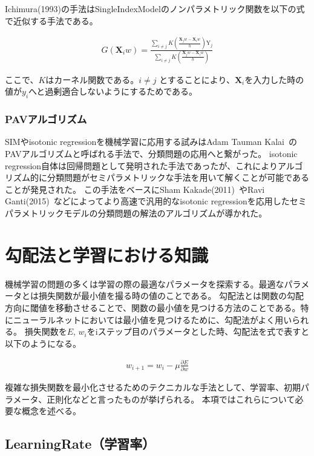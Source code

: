 Ichimura(1993)の手法はSingleIndexModelのノンパラメトリック関数を以下の式で近似する手法である。


\begin{eqnarray}
G(\mathbf{X}_iw)=\frac{\sum_{i\neq j} K\left(\frac{\mathbf{X}_j w - \mathbf{X}_i w}{h}\right)\mathrm{Y}_j}{\sum_{i\neq j} K\left(\frac{\mathbf{X}_j w - \mathbf{X}_i w}{h}\right)}
\label{eq:ichimura}
\end{eqnarray}

ここで、$ K $はカーネル関数である。$ i \neq j $ とすることにより、$ \mathbf{X}_i $を入力した時の値が$ y_i $へと過剰適合しないようにするためである。



\subsubsection{PAVアルゴリズム}

SIMやisotonic regressionを機械学習に応用する試みはAdam Tauman Kalai~\cite{isotron}のPAVアルゴリズムと呼ばれる手法で、分類問題の応用へと繋がった。
isotonic regression自体は回帰問題として発明された手法であったが、これによりアルゴリズム的に分類問題がセミパラメトリックな手法を用いて解くことが可能であることが発見された。
この手法をベースにSham Kakade(2011)~\cite{efficient_sim}やRavi Ganti(2015)~\cite{lsim}などによってより高速で汎用的なisotonic regressionを応用したセミパラメトリックモデルの分類問題の解法のアルゴリズムが導かれた。


\section{勾配法と学習における知識}
機械学習の問題の多くは学習の際の最適なパラメータを探索する。最適なパラメータとは損失関数が最小値を撮る時の値のことである。
勾配法とは関数の勾配方向に閾値を移動させることで、関数の最小値を見つける方法のことである。特にニューラルネットにおいては最小値を見つけるために、勾配法がよく用いられる。
損失関数を$ E $, $ w_i $をiステップ目のパラメータとした時、勾配法を式で表すと以下のようになる。

\begin{eqnarray}
w_{i + 1} = w_i - \mu \frac{\partial E}{\partial w}
\label{eq:learning_rate}
\end{eqnarray}

複雑な損失関数を最小化させるためのテクニカルな手法として、学習率、初期パラメータ、正則化などと言ったものが挙げられる。
本項ではこれらについて必要な概念を述べる。
\subsection{LearningRate（学習率）}

